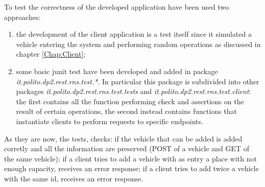 To test the correctness of the developed application have been used two approaches:
\begin{enumerate}
  \item the development of the client application is a test itself since it simulated a vehicle entering the system and performing random operations as discussed in chapter \ref{Chap:Client};
  \item some basic junit test have been developed and added in package \textit{it.polito.dp2.rest.rns.test.*}. In particular this package is subdivided into other packages \textit{it.polito.dp2.rest.rns.test.tests} and \textit{it.polito.dp2.rest.rns.test.client}: the first contains all the function performing check and assertions on the result of certain operations, the second instead contains functions that instantiate clients to perform requests to specific endpoints.
\end{enumerate}
As they are now, the tests, checks: if the vehicle that can be added is added corretly and all the information are preserved (POST of a vehicle and GET of the same vehicle); if a client tries to add a vehicle with as entry a place with not enough capacity, receives an error response; if a client tries to add twice a vehicle with the same id, receives an error response.
